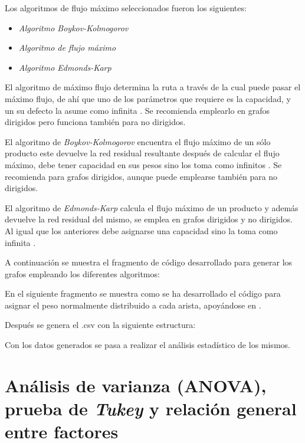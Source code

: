 \documentclass{article}
\begin{document}
Los algoritmos de flujo máximo seleccionados fueron los siguientes:
\begin{itemize}
\item \textit{Algoritmo Boykov-Kolmogorov }
\item \textit{Algoritmo de flujo máximo}
\item \textit{Algoritmo Edmonds-Karp}
\end{itemize} 


El algoritmo de máximo flujo determina la ruta a través de la cual puede pasar el máximo flujo, de ahí que uno de los parámetros que requiere es la capacidad, y un su defecto la asume como infinita \cite{mf}. Se recomienda emplearlo en grafos dirigidos pero funciona también para no dirigidos.

El algoritmo de \textit{Boykov-Kolmogorov} encuentra el flujo máximo de un sólo producto este devuelve la red residual resultante después de calcular el flujo máximo, debe tener capacidad en sus pesos sino los toma como infinitos \cite{bk}. Se recomienda para grafos dirigidos, aunque puede emplearse también para no dirigidos. 

El algoritmo de \textit{Edmonds-Karp} calcula el flujo máximo de un producto y además devuelve la red residual del mismo, se emplea en grafos dirigidos y no dirigidos. Al igual que los anteriores debe asignarse una capacidad sino la toma como infinita \cite{ek}.

A continuación se muestra el fragmento de código desarrollado para generar los grafos empleando los diferentes algoritmos:

\newpage



En el siguiente fragmento se muestra como se ha desarrollado el código para asignar el peso normalmente distribuido a cada arista, apoyándose en \cite{tutorialpython}.



Después se genera el .csv con la siguiente estructura:
\newpage


Con los datos generados se pasa a realizar el análisis estadístico de los mismos.


\section{Análisis de varianza (ANOVA), prueba de \textit{Tukey} y relación general entre factores} 
\end{document}
